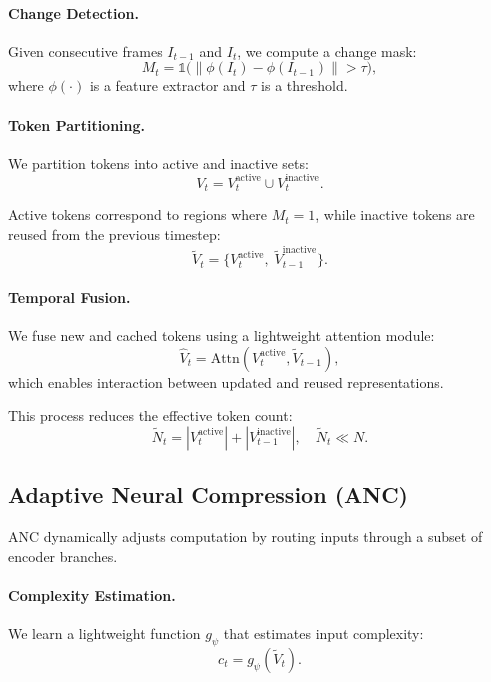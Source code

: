 \documentclass{article}
\begin{document}
\paragraph{Change Detection.}
Given consecutive frames $I_{t-1}$ and $I_t$, we compute a change mask:
\begin{equation}
M_t = \mathbb{1}\big( \| \phi(I_t) - \phi(I_{t-1}) \| > \tau \big),
\end{equation}
where $\phi(\cdot)$ is a feature extractor and $\tau$ is a threshold.

\paragraph{Token Partitioning.}
We partition tokens into active and inactive sets:
\begin{equation}
V_t = V_t^{\text{active}} \cup V_t^{\text{inactive}}.
\end{equation}

Active tokens correspond to regions where $M_t = 1$, while inactive tokens are reused from the previous timestep:
\begin{equation}
\tilde{V}_t = \{ V_t^{\text{active}}, \; \tilde{V}_{t-1}^{\text{inactive}} \}.
\end{equation}

\paragraph{Temporal Fusion.}
We fuse new and cached tokens using a lightweight attention module:
\begin{equation}
\hat{V}_t = \text{Attn}(V_t^{\text{active}}, \tilde{V}_{t-1}),
\end{equation}
which enables interaction between updated and reused representations.

This process reduces the effective token count:
\begin{equation}
\tilde{N}_t = |V_t^{\text{active}}| + |V_{t-1}^{\text{inactive}}|, \quad \tilde{N}_t \ll N.
\end{equation}

\subsection{Adaptive Neural Compression (ANC)}

ANC dynamically adjusts computation by routing inputs through a subset of encoder branches.

\paragraph{Complexity Estimation.}
We learn a lightweight function $g_\psi$ that estimates input complexity:
\begin{equation}
c_t = g_\psi(\tilde{V}_t).
\end{equation}
\end{document}
